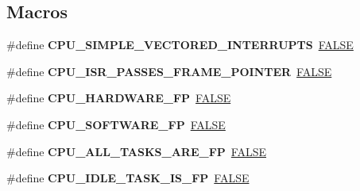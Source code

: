 \subsection*{Macros}
\begin{DoxyCompactItemize}
\item 
\mbox{\label{group__RTEMSScoreCPUi386_ga1eca01dbb1ef2873349cc4e222509f0a}} 
\#define {\bfseries C\+P\+U\+\_\+\+S\+I\+M\+P\+L\+E\+\_\+\+V\+E\+C\+T\+O\+R\+E\+D\+\_\+\+I\+N\+T\+E\+R\+R\+U\+P\+TS}~\mbox{\hyperlink{group__RTEMSScoreBaseDefs_gaa93f0eb578d23995850d61f7d61c55c1}{F\+A\+L\+SE}}
\item 
\mbox{\label{group__RTEMSScoreCPUi386_ga30c4d320f85b1383c5059da5b19b164a}} 
\#define {\bfseries C\+P\+U\+\_\+\+I\+S\+R\+\_\+\+P\+A\+S\+S\+E\+S\+\_\+\+F\+R\+A\+M\+E\+\_\+\+P\+O\+I\+N\+T\+ER}~\mbox{\hyperlink{group__RTEMSScoreBaseDefs_gaa93f0eb578d23995850d61f7d61c55c1}{F\+A\+L\+SE}}
\item 
\mbox{\label{group__RTEMSScoreCPUi386_ga112f88f13afe8bb8f1b13f1ca7e09b8d}} 
\#define {\bfseries C\+P\+U\+\_\+\+H\+A\+R\+D\+W\+A\+R\+E\+\_\+\+FP}~\mbox{\hyperlink{group__RTEMSScoreBaseDefs_gaa93f0eb578d23995850d61f7d61c55c1}{F\+A\+L\+SE}}
\item 
\mbox{\label{group__RTEMSScoreCPUi386_ga304f78c61edce38bb88e909f90a326dc}} 
\#define {\bfseries C\+P\+U\+\_\+\+S\+O\+F\+T\+W\+A\+R\+E\+\_\+\+FP}~\mbox{\hyperlink{group__RTEMSScoreBaseDefs_gaa93f0eb578d23995850d61f7d61c55c1}{F\+A\+L\+SE}}
\item 
\mbox{\label{group__RTEMSScoreCPUi386_ga225de03a8647bf307a73cf907969778d}} 
\#define {\bfseries C\+P\+U\+\_\+\+A\+L\+L\+\_\+\+T\+A\+S\+K\+S\+\_\+\+A\+R\+E\+\_\+\+FP}~\mbox{\hyperlink{group__RTEMSScoreBaseDefs_gaa93f0eb578d23995850d61f7d61c55c1}{F\+A\+L\+SE}}
\item 
\mbox{\label{group__RTEMSScoreCPUi386_gaf1c906c8ee4c3d012dc456285e42d3ee}} 
\#define {\bfseries C\+P\+U\+\_\+\+I\+D\+L\+E\+\_\+\+T\+A\+S\+K\+\_\+\+I\+S\+\_\+\+FP}~\mbox{\hyperlink{group__RTEMSScoreBaseDefs_gaa93f0eb578d23995850d61f7d61c55c1}{F\+A\+L\+SE}}
\item 
\mbox{\label{group__RTEMSScoreCPUi386_ga155bcf88149016c6c58f30eeab9f1598}} 

\end{DoxyCompactItemize}
